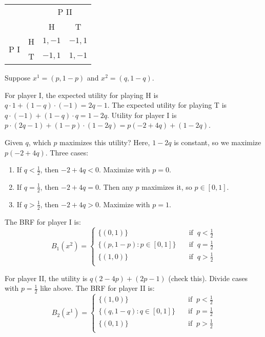 \documentclass[12pt,letterpaper]{report}
\begin{document}
\begin{ex}
  \begin{center}
    \renewcommand{\arraystretch}{1.2}
    \begin{tabular}{c c|c|c|}
      \multicolumn{2}{c}{} & \multicolumn{2}{c}{P II} \\
      \multicolumn{2}{c}{} & \multicolumn{1}{c}{H} & \multicolumn{1}{c}{T} \\
      \cline{3-4}
      \multirow{2}{*}{P I} & H & $1, -1$ & $-1, 1$ \\
      \cline{3-4}
      & T & $-1, 1$ & $1, -1$ \\
      \cline{3-4}
    \end{tabular}
  \end{center}

  Suppose $x^1 = (p, 1 - p)$ and $x^2 = (q, 1 - q)$.

  For player I, the expected utility for playing H is $q \cdot 1 + (1 - q) \cdot (-1) = 2q - 1$.
  The expected utility for playing T is $q \cdot (-1) + (1 - q) \cdot q = 1 - 2q$.
  Utility for player I is $p \cdot (2q - 1) + (1 - p) \cdot (1 - 2q) = p(-2 + 4q) + (1 - 2q)$.

  Given $q$, which $p$ maximizes this utility?
  Here, $1 - 2q$ is constant, so we maximize $p(-2 + 4q)$. Three cases:
  \begin{enumerate}
    \item
    If $q < \frac{1}{2}$, then $-2 + 4q < 0$.
    Maximize with $p = 0$.
    \item
    If $q = \frac{1}{2}$, then $-2 + 4q = 0$.
    Then any $p$ maximizes it, so $p \in [0, 1]$.
    \item
    If $q > \frac{1}{2}$, then $-2 + 4q > 0$.
    Maximize with $p = 1$.
  \end{enumerate}
  The BRF for player I is:
  \[
    B_1(x^2) = \begin{cases}
      \{ (0, 1) \} & \text{if } \ q < \frac{1}{2} \\
      \{ (p, 1 - p) : p \in [0, 1] \} \quad & \text{if } \ q = \frac{1}{2} \\
      \{ (1, 0) \} & \text{if } \ q > \frac{1}{2} \\
    \end{cases}
  \]

  For player II, the utility is $q(2 - 4p) + (2p - 1)$ (check this).
  Divide cases with $p = \frac{1}{2}$ like above.
  The BRF for player II is:
  \[
    B_2(x^1) = \begin{cases}
      \{ (1, 0) \} & \text{if } \ p < \frac{1}{2} \\
      \{ (q, 1 - q) : q \in [0, 1] \} \quad & \text{if } \ p = \frac{1}{2} \\
      \{ (0, 1) \} & \text{if } \ p > \frac{1}{2} \\
    \end{cases}
  \]


\end{ex}
\end{document}
